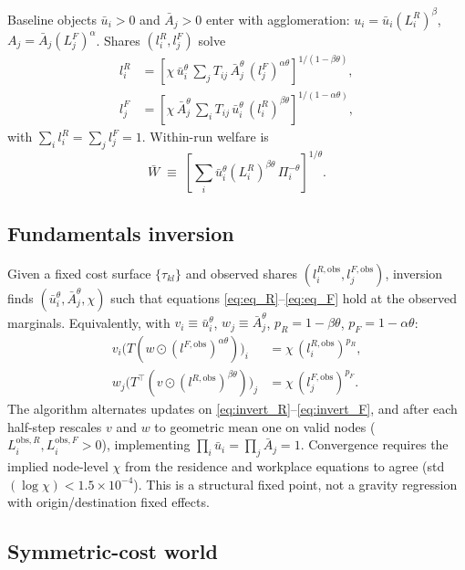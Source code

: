 \documentclass[12pt]{article}
\newcommand{\Wbar}{\bar W}
\newcommand{\ubar}{\bar u}
\newcommand{\Abar}{\bar A}
\newcommand{\obs}{\mathrm{obs}}
\begin{document}
Baseline objects $\ubar_i>0$ and $\Abar_j>0$ enter with agglomeration:
$u_i=\ubar_i(L_i^R)^{\beta}$, $A_j=\Abar_j(L_j^F)^{\alpha}$.
Shares $(l_i^R,l_j^F)$ solve
\begin{align}
  l_i^R
  &= \left[
      \chi\,\ubar_i^{\theta}\,
      \sum_j T_{ij}\,
      \Abar_j^{\theta}\,
      (l_j^F)^{\alpha\theta}
    \right]^{\!1/(1-\beta\theta)},
  \label{eq:eq_R} \\[0.4em]
  l_j^F
  &= \left[
      \chi\,\Abar_j^{\theta}\,
      \sum_i T_{ij}\,
      \ubar_i^{\theta}\,
      (l_i^R)^{\beta\theta}
    \right]^{\!1/(1-\alpha\theta)},
  \label{eq:eq_F}
\end{align}
with $\sum_i l_i^R=\sum_j l_j^F=1$.
Within-run welfare is
\begin{equation}
  \Wbar \;\equiv\;
  \left[
    \sum_i \ubar_i^{\theta}(L_i^R)^{\beta\theta}\,
    \Pi_i^{-\theta}
  \right]^{1/\theta}.
  \label{eq:welfare}
\end{equation}

\subsection{Fundamentals inversion}\label{sec:inversion}

Given a fixed cost surface $\{\tau_{kl}\}$ and observed shares
$(l_i^{R,\obs},l_j^{F,\obs})$, inversion finds
$(\ubar_i^{\theta},\Abar_j^{\theta},\chi)$ such that equations
\eqref{eq:eq_R}--\eqref{eq:eq_F} hold at the observed marginals.
Equivalently, with $v_i\equiv\ubar_i^{\theta}$, $w_j\equiv\Abar_j^{\theta}$,
$p_R=1-\beta\theta$, $p_F=1-\alpha\theta$:
\begin{align}
  v_i \bigl(T (w \odot (l^{F,\obs})^{\alpha\theta})\bigr)_i
  &= \chi\,(l_i^{R,\obs})^{p_R},
  \label{eq:invert_R}\\
  w_j \bigl(T^{\top} (v \odot (l^{R,\obs})^{\beta\theta})\bigr)_j
  &= \chi\,(l_j^{F,\obs})^{p_F}.
  \label{eq:invert_F}
\end{align}
The algorithm alternates updates on \eqref{eq:invert_R}--\eqref{eq:invert_F}, and after
each half-step rescales $v$ and $w$ to geometric mean one on valid nodes
($L^{\obs,R}_i,L^{\obs,F}_i>0$), implementing
$\prod_i\ubar_i=\prod_j\Abar_j=1$.
Convergence requires the implied node-level $\chi$ from the residence and workplace
equations to agree (std$(\log\chi)<1.5\times 10^{-4}$).
This is a structural fixed point, not a gravity regression with origin/destination fixed
effects.

\subsection{Symmetric-cost world}
\end{document}
